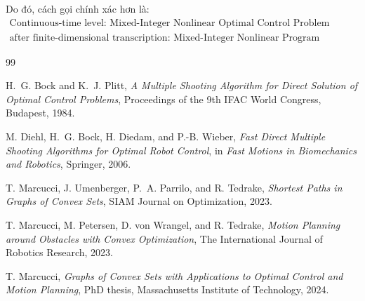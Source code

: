 \documentclass[12pt]{article}
\begin{document}
Do đó, cách gọi chính xác hơn là:
\begin{equation*}
\boxed{
\begin{array}{c}
\text{Continuous-time level: Mixed-Integer Nonlinear Optimal Control Problem (MIOCP),}\\
\text{after finite-dimensional transcription: Mixed-Integer Nonlinear Program (MINLP).}
\end{array}}
\end{equation*}

\begin{thebibliography}{99}

H.~G. Bock and K.~J. Plitt,
\newblock \emph{A Multiple Shooting Algorithm for Direct Solution of Optimal Control Problems},
\newblock Proceedings of the 9th IFAC World Congress, Budapest, 1984.

M. Diehl, H.~G. Bock, H. Diedam, and P.-B. Wieber,
\newblock \emph{Fast Direct Multiple Shooting Algorithms for Optimal Robot Control},
\newblock in \emph{Fast Motions in Biomechanics and Robotics}, Springer, 2006.

T. Marcucci, J. Umenberger, P.~A. Parrilo, and R. Tedrake,
\newblock \emph{Shortest Paths in Graphs of Convex Sets},
\newblock SIAM Journal on Optimization, 2023.

T. Marcucci, M. Petersen, D. von Wrangel, and R. Tedrake,
\newblock \emph{Motion Planning around Obstacles with Convex Optimization},
\newblock The International Journal of Robotics Research, 2023.

T. Marcucci,
\newblock \emph{Graphs of Convex Sets with Applications to Optimal Control and Motion Planning},
\newblock PhD thesis, Massachusetts Institute of Technology, 2024.

\end{thebibliography}
\end{document}
